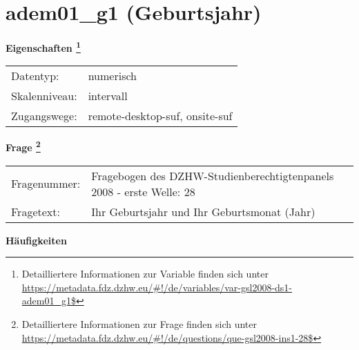
    \setcounter{footnote}{0}

    \vspace*{-1.8cm}
	\section{adem01\_g1 (Geburtsjahr)}
	\label{section:adem01_g1}



    \vspace*{0.5cm}
    \noindent\textbf{Eigenschaften
	\footnote{Detailliertere Informationen zur Variable finden sich unter
		\url{https://metadata.fdz.dzhw.eu/\#!/de/variables/var-gsl2008-ds1-adem01_g1$}}}\\
	\begin{tabularx}{\hsize}{@{}lX}
	Datentyp: & numerisch \\
	Skalenniveau: & intervall \\
	Zugangswege: &
	  remote-desktop-suf, 
	  onsite-suf
 \\
    \end{tabularx}



				\vspace*{0.5cm}
                \noindent\textbf{Frage
	                \footnote{Detailliertere Informationen zur Frage finden sich unter
		              \url{https://metadata.fdz.dzhw.eu/\#!/de/questions/que-gsl2008-ins1-28$}}}\\
				\begin{tabularx}{\hsize}{@{}lX}
					Fragenummer: &
					  Fragebogen des DZHW-Studienberechtigtenpanels 2008 - erste Welle:
					  28
 \\
					Fragetext: & Ihr Geburtsjahr und Ihr Geburtsmonat (Jahr) \\
				\end{tabularx}





        		\vspace*{0.5cm}
                \noindent\textbf{Häufigkeiten}

